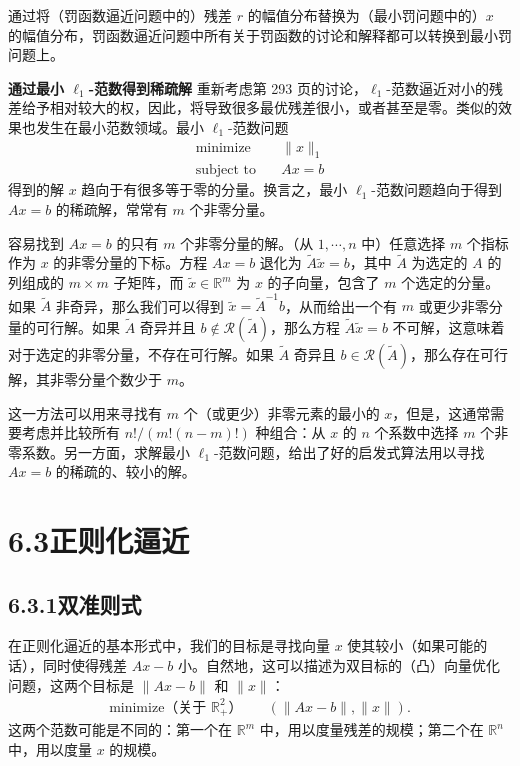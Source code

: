 \documentclass[UTF8, 12pt, fontset=fandol, oneside]{ctexart}
\begin{document}
通过将（罚函数逼近问题中的）残差 $r$ 的幅值分布替换为（最小罚问题中的）$x$ 的幅值分布，罚函数逼近问题中所有关于罚函数的讨论和解释都可以转换到最小罚问题上。

\noindent\textbf{通过最小 $\ell_1$-范数得到稀疏解}\quad
重新考虑第 293 页的讨论，$\ell_1$-范数逼近对小的残差给予相对较大的权，因此，将导致很多最优残差很小，或者甚至是零。类似的效果也发生在最小范数领域。最小 $\ell_1$-范数问题
\[
\begin{aligned}
\text{minimize}\quad & \|x\|_1\\
\text{subject to}\quad & Ax=b
\end{aligned}
\]
得到的解 $x$ 趋向于有很多等于零的分量。换言之，最小 $\ell_1$-范数问题趋向于得到 $Ax=b$ 的稀疏解，常常有 $m$ 个非零分量。

容易找到 $Ax=b$ 的只有 $m$ 个非零分量的解。（从 $1,\cdots,n$ 中）任意选择 $m$ 个指标作为 $x$ 的非零分量的下标。方程 $Ax=b$ 退化为 $\tilde{A}\tilde{x}=b$，其中 $\tilde{A}$ 为选定的 $A$ 的列组成的 $m\times m$ 子矩阵，而 $\tilde{x}\in\mathbb{R}^m$ 为 $x$ 的子向量，包含了 $m$ 个选定的分量。如果 $\tilde{A}$ 非奇异，那么我们可以得到 $\tilde{x}=\tilde{A}^{-1}b$，从而给出一个有 $m$ 或更少非零分量的可行解。如果 $\tilde{A}$ 奇异并且 $b\notin\mathcal{R}(\tilde{A})$，那么方程 $\tilde{A}\tilde{x}=b$ 不可解，这意味着对于选定的非零分量，不存在可行解。如果 $\tilde{A}$ 奇异且 $b\in\mathcal{R}(\tilde{A})$，那么存在可行解，其非零分量个数少于 $m$。

这一方法可以用来寻找有 $m$ 个（或更少）非零元素的最小的 $x$，但是，这通常需要考虑并比较所有 $n!/(m!(n-m)!)$ 种组合：从 $x$ 的 $n$ 个系数中选择 $m$ 个非零系数。另一方面，求解最小 $\ell_1$-范数问题，给出了好的启发式算法用以寻找 $Ax=b$ 的稀疏的、较小的解。

\section*{6.3\quad 正则化逼近}

\subsection*{6.3.1\quad 双准则式}

在正则化逼近的基本形式中，我们的目标是寻找向量 $x$ 使其较小（如果可能的话），同时使得残差 $Ax-b$ 小。自然地，这可以描述为双目标的（凸）向量优化问题，这两个目标是 $\|Ax-b\|$ 和 $\|x\|$：
\begin{equation}
\begin{aligned}
\text{minimize（关于 $\mathbb{R}_+^2$）}\quad & (\|Ax-b\|,\|x\|).
\end{aligned}
\tag{6.7}
\end{equation}
这两个范数可能是不同的：第一个在 $\mathbb{R}^m$ 中，用以度量残差的规模；第二个在 $\mathbb{R}^n$ 中，用以度量 $x$ 的规模。
\end{document}
